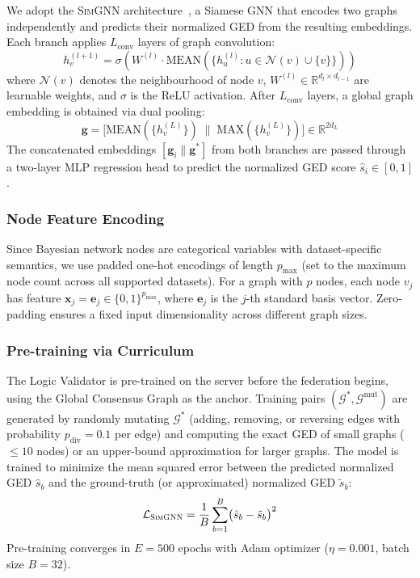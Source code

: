 \documentclass[journal]{IEEEtran}
\newcommand{\simgnn}{\textsc{SimGNN}}
\newcommand{\RR}{\mathbb{R}}
\newcommand{\calG}{\mathcal{G}}
\begin{document}
We adopt the \simgnn{} architecture~\cite{bai2019simgnn}, a Siamese GNN
that encodes two graphs independently and predicts their normalized GED
from the resulting embeddings. Each branch applies $L_{\text{conv}}$ layers
of graph convolution:
\begin{equation}
  h_v^{(l+1)} = \sigma\!\left(W^{(l)} \cdot
  \mathrm{MEAN}\!\left(\{h_u^{(l)} : u \in \mathcal{N}(v) \cup \{v\}\}\right)\right)
\end{equation}
where $\mathcal{N}(v)$ denotes the neighbourhood of node $v$,
$W^{(l)} \in \RR^{d_l \times d_{l-1}}$ are learnable weights, and
$\sigma$ is the ReLU activation. After $L_{\text{conv}}$ layers, a global
graph embedding is obtained via dual pooling:
\begin{equation}
  \mathbf{g} = \bigl[\mathrm{MEAN}(\{h_v^{(L)}\}) \;\|\;
                      \mathrm{MAX}(\{h_v^{(L)}\})\bigr]
  \in \RR^{2d_{L}}
\end{equation}
The concatenated embeddings $[\mathbf{g}_i \| \mathbf{g}^*]$ from both branches
are passed through a two-layer MLP regression head to predict the
normalized GED score $\hat{s}_i \in [0,1]$.

\subsubsection{Node Feature Encoding}

Since Bayesian network nodes are categorical variables with dataset-specific
semantics, we use padded one-hot encodings of length $p_{\max}$ (set to the
maximum node count across all supported datasets). For a graph with $p$
nodes, each node $v_j$ has feature $\mathbf{x}_j = \mathbf{e}_j \in \{0,1\}^{p_{\max}}$,
where $\mathbf{e}_j$ is the $j$-th standard basis vector. Zero-padding ensures
a fixed input dimensionality across different graph sizes.

\subsubsection{Pre-training via Curriculum}

The Logic Validator is pre-trained on the server before the federation
begins, using the Global Consensus Graph as the anchor. Training pairs
$(\calG^*, \calG^{\text{mut}})$ are generated by randomly mutating
$\calG^*$ (adding, removing, or reversing edges with probability
$p_{\text{div}} = 0.1$ per edge) and computing the exact GED of small
graphs ($\leq 10$ nodes) or an upper-bound approximation for larger graphs.
The model is trained to minimize the mean squared error between the
predicted normalized GED $\hat{s}_b$ and the ground-truth (or approximated)
normalized GED $\tilde{s}_b$:
\begin{equation}
  \mathcal{L}_{\simgnn} = \frac{1}{B} \sum_{b=1}^B
  \bigl(\hat{s}_b - \tilde{s}_b\bigr)^2
  \label{eq:simgnn_loss}
\end{equation}
Pre-training converges in $E = 500$ epochs with
Adam optimizer ($\eta = 0.001$, batch size $B=32$).
\end{document}
